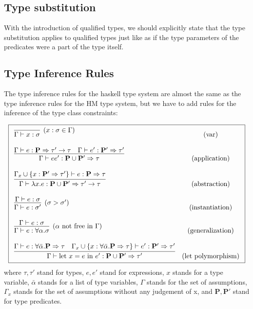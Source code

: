 \subsection{Type substitution}

With the introduction of qualified types, we should explicitly state that the type substitution applies to qualified types just like as if the type parameters of the predicates were a part of the type itself.

\subsection{Type Inference Rules}

The type inference rules for the haskell type system are almost the same as the type inference rules for the HM type system, but we have to add rules for the inference of the type class constraints:

\begin{defn}
    $$\boxed{\begin{array}{l c}
        \infer[(x : \sigma \in \Gamma)]{\Gamma \vdash x : \sigma}{} & (\text{var}) \\\\
        \infer{\Gamma \vdash e e' : \mathbf{P} \cup \mathbf{P'}  \Rightarrow \tau}{\Gamma \vdash e : \mathbf{P} \Rightarrow \tau' \rightarrow \tau & \Gamma \vdash e' : \mathbf{P'} \Rightarrow \tau'} & (\text{application}) \\\\
        \infer{\Gamma \vdash \lambda x . e : \mathbf{P} \cup \mathbf{P'} \Rightarrow \tau' \rightarrow \tau}{\Gamma_x \cup \{x : \mathbf{P'} \Rightarrow \tau'\} \vdash e : \mathbf{P} \Rightarrow \tau} & (\text{abstraction}) \\\\
        \infer[(\sigma > \sigma')]{\Gamma \vdash e : \sigma'}{\Gamma \vdash e : \sigma} & (\text{instantiation}) \\\\
        \infer[(\alpha \text{ not free in }\Gamma)]{\Gamma \vdash e : \forall \alpha . \sigma}{\Gamma \vdash e : \sigma} & (\text{generalization}) \\\\
        \infer{\Gamma \vdash \text{let } x = e \text{ in } e' : \mathbf{P} \cup \mathbf{P'} \Rightarrow \tau'}{\Gamma \vdash e : \forall \bar{\alpha} .  \mathbf{P} \Rightarrow \tau & \Gamma_x \cup \{x :\forall \bar{\alpha} .  \mathbf{P} \Rightarrow \tau \} \vdash e' : \mathbf{P'} \Rightarrow \tau'} & (\text{let polymorphism})
    \end{array}}$$
    where $\tau, \tau'$ stand for types, $e, e'$ stand for expressions, $x$ stands for a type variable, $\bar{\alpha}$ stands for a list of type variables, $\Gamma$ stands for the set of assumptions, $\Gamma_x$ stands for the set of assumptions without any judgement of x, and $\mathbf{P}, \mathbf{P'}$ stand for type predicates.
\end{defn}


